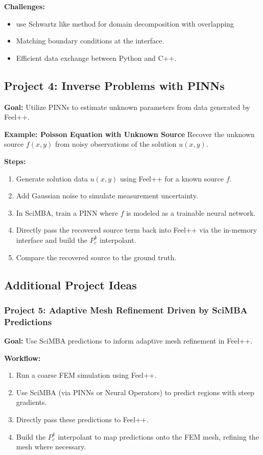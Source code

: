 \documentclass[11pt]{article}
\begin{document}
\textbf{Challenges:}
\begin{itemize}
    \item use Schwartz like method for domain decomposition with overlapping 
    \item Matching boundary conditions at the interface.
    \item Efficient data exchange between Python and C++.
\end{itemize}

\subsection{Project 4: Inverse Problems with PINNs}
\textbf{Goal:}  
Utilize PINNs to estimate unknown parameters from data generated by Feel++.

\textbf{Example: Poisson Equation with Unknown Source}  
Recover the unknown source \( f(x,y) \) from noisy observations of the solution \( u(x,y) \).

\textbf{Steps:}
\begin{enumerate}[label=\arabic*.]
    \item Generate solution data \( u(x,y) \) using Feel++ for a known source \( f \).
    \item Add Gaussian noise to simulate measurement uncertainty.
    \item In SciMBA, train a PINN where \( f \) is modeled as a trainable neural network.
    \item Directly pass the recovered source term back into Feel++ via the in-memory interface and build the \( P_c^k \) interpolant.
    \item Compare the recovered source to the ground truth.
\end{enumerate}

\subsection{Additional Project Ideas}

\subsubsection*{Project 5: Adaptive Mesh Refinement Driven by SciMBA Predictions}
\textbf{Goal:}  
Use SciMBA predictions to inform adaptive mesh refinement in Feel++.

\textbf{Workflow:}
\begin{enumerate}[label=\arabic*.]
    \item Run a coarse FEM simulation using Feel++.
    \item Use SciMBA (via PINNs or Neural Operators) to predict regions with steep gradients.
    \item Directly pass these predictions to Feel++.
    \item Build the \( P_c^k \) interpolant to map predictions onto the FEM mesh, refining the mesh where necessary.
\end{enumerate}
\end{document}
